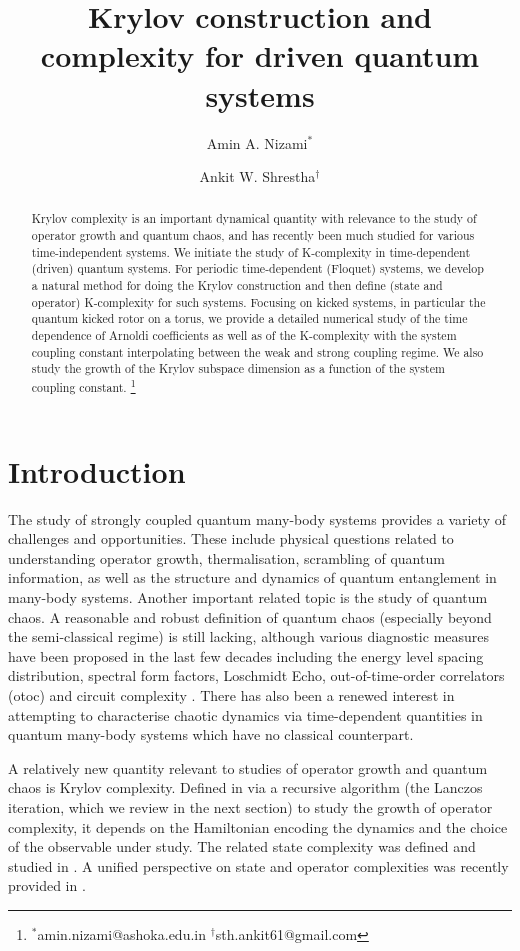\documentclass[a4paper,12pt]{article}
\title{\textbf{Krylov construction and complexity for driven quantum systems}}
\author{Amin A. Nizami$^{*}$}
\author{Ankit W. Shrestha$^{\dagger}$}
\affil{\small{Department of Physics, Ashoka University, Rajiv Gandhi Education City, Rai, NCR, India 131029}}
\date{}
\newcommand\blfootnote[1]{%
  \begingroup
  \renewcommand\thefootnote{}\footnote{#1}%
  \addtocounter{footnote}{-1}%
  \endgroup
}
\begin{document}
\maketitle
\begin{abstract}
Krylov complexity is an important dynamical quantity with relevance to the study of operator growth and quantum chaos, and has recently been much studied for various time-independent systems. We initiate the study of K-complexity in time-dependent (driven) quantum systems. For periodic time-dependent (Floquet) systems, we develop a natural method for doing the Krylov construction and then define (state and operator) K-complexity for such systems.  Focusing on kicked systems, in particular the quantum kicked rotor on a torus, we provide a detailed numerical study of the time dependence of Arnoldi coefficients as well as of the K-complexity with the system coupling constant interpolating between the weak and strong coupling regime. We also study the growth of the Krylov subspace dimension as a function of the system coupling constant.
    \blfootnote{ $^*$amin.nizami@ashoka.edu.in  \hspace{0.6cm} $^\dagger$sth.ankit61@gmail.com }
\end{abstract}
\section{Introduction}
The study of strongly coupled quantum many-body systems provides a variety of challenges and opportunities. These include physical questions related to understanding operator growth, thermalisation, scrambling of quantum information, as well as the structure and dynamics of quantum entanglement in many-body systems. Another important related topic is the study of quantum chaos. A reasonable and robust definition of quantum chaos (especially beyond the semi-classical regime) is still lacking, although various diagnostic measures have been proposed in the last few decades including the energy level spacing distribution, spectral form factors, Loschmidt Echo, out-of-time-order correlators (otoc) and circuit complexity \cite{BGS:84, Peres:1984pd, LO:69, Maldacena:2015waa}. There has also been a renewed interest in attempting to characterise chaotic dynamics via time-dependent quantities in quantum many-body systems which have no classical counterpart.

A relatively new quantity relevant to studies of operator growth and quantum chaos is Krylov complexity. Defined in \cite{Parker_2019} via a recursive algorithm (the Lanczos iteration, which we review in the next section) to study the growth of operator complexity, it depends on the Hamiltonian encoding the dynamics and the choice of the observable under study. The related state complexity was defined and studied in \cite{Balasubramanian_2022}.  A unified perspective on state and operator complexities was recently provided in \cite{Alishahiha:2022anw}.
\end{document}
